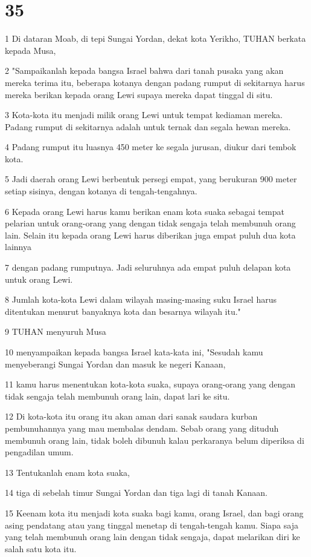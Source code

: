 \chapter{35}

\par 1 Di dataran Moab, di tepi Sungai Yordan, dekat kota Yerikho, TUHAN berkata kepada Musa,
\par 2 "Sampaikanlah kepada bangsa Israel bahwa dari tanah pusaka yang akan mereka terima itu, beberapa kotanya dengan padang rumput di sekitarnya harus mereka berikan kepada orang Lewi supaya mereka dapat tinggal di situ.
\par 3 Kota-kota itu menjadi milik orang Lewi untuk tempat kediaman mereka. Padang rumput di sekitarnya adalah untuk ternak dan segala hewan mereka.
\par 4 Padang rumput itu luasnya 450 meter ke segala jurusan, diukur dari tembok kota.
\par 5 Jadi daerah orang Lewi berbentuk persegi empat, yang berukuran 900 meter setiap sisinya, dengan kotanya di tengah-tengahnya.
\par 6 Kepada orang Lewi harus kamu berikan enam kota suaka sebagai tempat pelarian untuk orang-orang yang dengan tidak sengaja telah membunuh orang lain. Selain itu kepada orang Lewi harus diberikan juga empat puluh dua kota lainnya
\par 7 dengan padang rumputnya. Jadi seluruhnya ada empat puluh delapan kota untuk orang Lewi.
\par 8 Jumlah kota-kota Lewi dalam wilayah masing-masing suku Israel harus ditentukan menurut banyaknya kota dan besarnya wilayah itu."
\par 9 TUHAN menyuruh Musa
\par 10 menyampaikan kepada bangsa Israel kata-kata ini, "Sesudah kamu menyeberangi Sungai Yordan dan masuk ke negeri Kanaan,
\par 11 kamu harus menentukan kota-kota suaka, supaya orang-orang yang dengan tidak sengaja telah membunuh orang lain, dapat lari ke situ.
\par 12 Di kota-kota itu orang itu akan aman dari sanak saudara kurban pembunuhannya yang mau membalas dendam. Sebab orang yang dituduh membunuh orang lain, tidak boleh dibunuh kalau perkaranya belum diperiksa di pengadilan umum.
\par 13 Tentukanlah enam kota suaka,
\par 14 tiga di sebelah timur Sungai Yordan dan tiga lagi di tanah Kanaan.
\par 15 Keenam kota itu menjadi kota suaka bagi kamu, orang Israel, dan bagi orang asing pendatang atau yang tinggal menetap di tengah-tengah kamu. Siapa saja yang telah membunuh orang lain dengan tidak sengaja, dapat melarikan diri ke salah satu kota itu.
